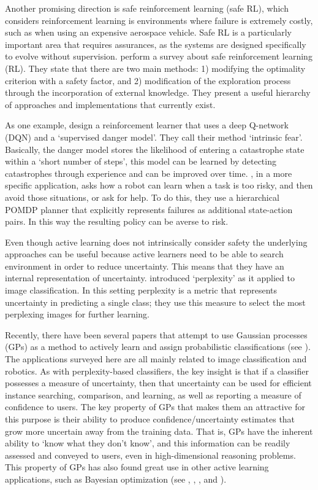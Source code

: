     Another promising direction is safe reinforcement learning (safe RL), which considers reinforcement learning is environments where failure is extremely costly, such as when using an expensive aerospace vehicle. Safe RL is a particularly important area that requires assurances, as the systems are designed specifically to evolve without supervision. \citet{Garcia2015-rs} perform a survey about safe reinforcement learning (RL). They state that there are two main methods: 1) modifying the optimality criterion with a safety factor, and 2) modification of the exploration process through the incorporation of external knowledge. They present a useful hierarchy of approaches and implementations that currently exist.

    As one example, \citet{Lipton2016-dq} design a reinforcement learner that uses a deep Q-network (DQN) and a `supervised danger model'. They call their method `intrinsic fear'. Basically, the danger model stores the likelihood of entering a catastrophe state within a `short number of steps', this model can be learned by detecting catastrophes through experience and can be improved over time. \citet{Curran2016-ij}, in a more specific application, asks how a robot can learn when a task is too risky, and then avoid those situations, or ask for help. To do this, they use a hierarchical POMDP planner that explicitly represents failures as additional state-action pairs. In this way the resulting policy can be averse to risk.

    Even though active learning does not intrinsically consider safety the underlying approaches can be useful because active learners need to be able to search environment in order to reduce uncertainty. This means that they have an internal representation of uncertainty. \citet{Paul2011-vr} introduced `perplexity' as it applied to image classification. In this setting perplexity is a metric that represents uncertainty in predicting a single class; they use this measure to select the most perplexing images for further learning.

    Recently, there have been several papers that attempt to use Gaussian processes (GPs) as a method to actively learn and assign probabilistic classifications (see \citet{MacKay1992-sp,Triebel2016-kj,Triebel2013-ow,Triebel2013-ku,Grimmett2013-gj,Grimmett2016-yc,Berczi2015-rd,Dequaire2016-kh}). The applications surveyed here are all mainly related to image classification and robotics. As with perplexity-based classifiers, the key insight is that if a classifier possesses a measure of uncertainty, then that uncertainty can be used for efficient instance searching, comparison, and learning, as well as reporting a measure of confidence to users. The key property of GPs that makes them an attractive for this purpose is their ability to produce confidence/uncertainty estimates that grow more uncertain away from the training data. That is, GPs have the inherent ability to `know what they don't know', and this information can be readily assessed and conveyed to users, even in high-dimensional reasoning problems. This property of GPs has also found great use in other active learning applications, such as  Bayesian optimization (see \citet{Williams1998-kr}, \citet{Snoek2012-tt}, \citet{Brochu2010-tj}, and \citet{Israelsen2017-zb}).


